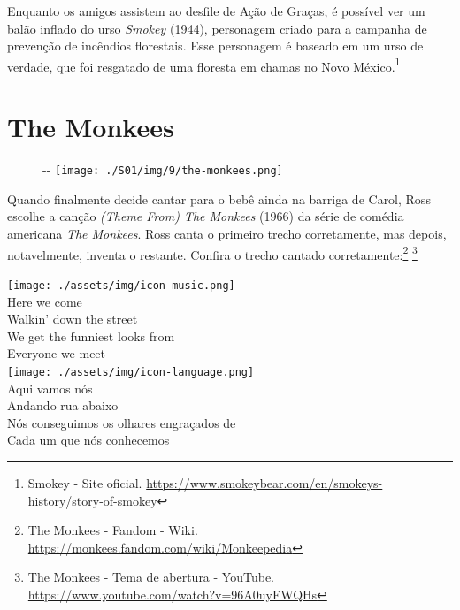 Enquanto os amigos assistem ao desfile de Ação de Graças, é possível ver
um balão inflado do urso \emph{Smokey} (1944), personagem criado para a
campanha de prevenção de incêndios florestais. Esse personagem é baseado
em um urso de verdade, que foi resgatado de uma floresta em chamas no
Novo México.\footnote{\sloppy Smokey - Site oficial. \url{https://www.smokeybear.com/en/smokeys-history/story-of-smokey}}

\hypertarget{the-monkees}{%
\section{The Monkees}\label{the-monkees}}

\begin{figure}[!ht]
  \begin{adjustwidth}{-\oddsidemargin-1in}{-\rightmargin}
    \centering
    \texttt{[image: ./S01/img/9/the-monkees.png]}
  \end{adjustwidth}
\end{figure}

Quando finalmente decide cantar para o bebê ainda na barriga de Carol,
Ross escolhe a canção \emph{(Theme From) The Monkees} (1966) da série de
comédia americana \emph{The Monkees}. Ross canta o primeiro trecho
corretamente, mas depois, notavelmente, inventa o restante. Confira o
trecho cantado corretamente:\footnote{\sloppy The Monkees - Fandom - Wiki. \url{https://monkees.fandom.com/wiki/Monkeepedia}}
\footnote{\sloppy The Monkees - Tema de abertura - YouTube. \url{https://www.youtube.com/watch?v=96A0uyFWQHs}}

\bigskip
\begin{tcolorbox}[enhanced,
    drop fuzzy shadow southeast, boxrule=0.3pt,
    lower separated=false, sidebyside, sidebyside align=top,
    halign=flush right, halign lower=left, breakable,
    colframe=black!30!dialogoBorder,colback=musicaBg]
\texttt{[image: ./assets/img/icon-music.png]}\\
Here we come\\Walkin’ down the street\\We get the funniest looks from\\Everyone we meet\\
\tcblower
\texttt{[image: ./assets/img/icon-language.png]}\\
Aqui vamos nós\\Andando rua abaixo\\Nós conseguimos os olhares engraçados de\\Cada um que nós conhecemos\\
\end{tcolorbox}

